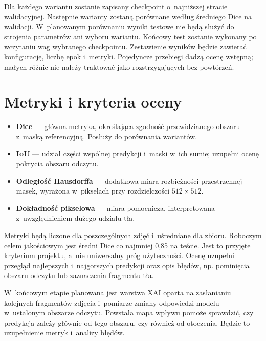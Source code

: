 \documentclass[11pt,a4paper]{article}
\begin{document}
Dla każdego wariantu zostanie zapisany checkpoint o~najniższej stracie
walidacyjnej. Następnie warianty zostaną porównane według średniego Dice
na walidacji. W~planowanym porównaniu wyniki testowe nie będą służyć
do strojenia parametrów ani wyboru wariantu. Końcowy test zostanie wykonany
po wczytaniu wag wybranego checkpointu. Zestawienie wyników będzie zawierać
konfigurację, liczbę epok i~metryki. Pojedyncze przebiegi dadzą ocenę wstępną;
małych różnic nie należy traktować jako rozstrzygających bez powtórzeń.

\section{Metryki i kryteria oceny}

\begin{itemize}
  \item \textbf{Dice} — główna metryka, określająca zgodność przewidzianego
  obszaru z~maską referencyjną. Posłuży do porównania wariantów.
  \item \textbf{IoU} — udział części wspólnej predykcji i~maski w~ich sumie;
  uzupełni ocenę pokrycia obszaru odczytu.
  \item \textbf{Odległość Hausdorffa} — dodatkowa miara rozbieżności
  przestrzennej masek, wyrażona w~pikselach przy rozdzielczości $512\times512$.
  \item \textbf{Dokładność pikselowa} — miara pomocnicza, interpretowana
  z~uwzględnieniem dużego udziału tła.
\end{itemize}

Metryki będą liczone dla poszczególnych zdjęć i~uśredniane dla zbioru.
Roboczym celem jakościowym jest średni Dice co najmniej 0,85 na teście.
Jest to przyjęte kryterium projektu, a~nie uniwersalny próg użyteczności.
Ocenę uzupełni przegląd najlepszych i~najgorszych predykcji oraz opis błędów,
np. pominięcia obszaru odczytu lub zaznaczenia fragmentu tła.

W~końcowym etapie planowana jest warstwa XAI oparta na zasłanianiu kolejnych
fragmentów zdjęcia i~pomiarze zmiany odpowiedzi modelu w~ustalonym obszarze
odczytu. Powstała mapa wpływu pomoże sprawdzić, czy predykcja zależy głównie
od tego obszaru, czy również od otoczenia. Będzie to uzupełnienie metryk
i~analizy błędów.
\end{document}
